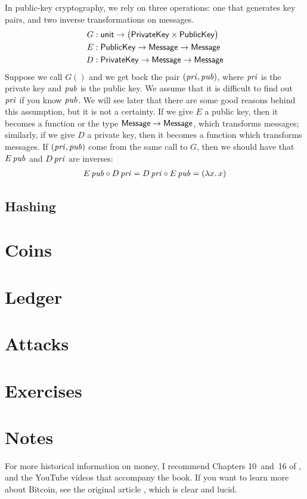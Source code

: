 In public-key cryptography, we rely on three operations: one that generates key pairs, and two inverse transformations on messages.
\begin{align*}
  G &: {\sf unit} \to \bigl( {\sf PrivateKey} \times {\sf PublicKey}\bigr) \\
  E &: {\sf PublicKey} \to {\sf Message} \to {\sf Message} \\
  D &: {\sf PrivateKey} \to {\sf Message} \to {\sf Message}
\end{align*}
Suppose we call $G()$ and we get back the pair $({\it pri},{\it pub})$, where $\it pri$ is the private key and ${\it pub}$ is the public key.
We assume that it is difficult to find out ${\it pri}$ if you know ${\it pub}$.
We will see later that there are some good reasons behind this assumption, but it is not a certainty.
If we give $E$ a public key, then it becomes a function or the type ${\sf Message} \to {\sf Message}$, which transforms messages;
similarly, if we give $D$ a private key, then it becomes a function which transforms messages.
If $({\it pri}, {\it pub})$ come from the same call to $G$, then we should have that $E\,{\it pub}$ and $D\,{\it pri}$ are inverses:
\begin{align*}
  E\,{\it pub} \circ D\,{\it pri}
  = D\,{\it pri} \circ E\,{\it pub}
  = (\lambda x.\, x)
\end{align*}


\subsection{Hashing}

\section{Coins}\label{sec:bitcoin-coin}

\section{Ledger}\label{sec:bitcoin-ledger}

\section{Attacks}\label{sec:bitcoin-attacks}

\section{Exercises}


\section{Notes}

For more historical information on money, I recommend Chapters 10~and~16 of \citet{sapiens}, and the YouTube videos that accompany the book.
If you want to learn more about Bitcoin, see the original article \citep{bitcoin}, which is clear and lucid.




